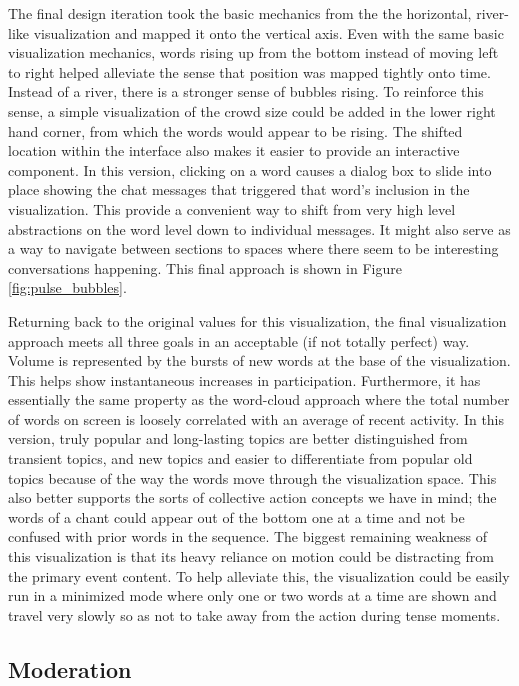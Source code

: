The final design iteration took the basic mechanics from the the horizontal, river-like visualization and mapped it onto the vertical axis. Even with the same basic visualization mechanics, words rising up from the bottom instead of moving left to right helped alleviate the sense that position was mapped tightly onto time. Instead of a river, there is a stronger sense of bubbles rising. To reinforce this sense, a simple visualization of the crowd size could be added in the lower right hand corner, from which the words would appear to be rising. The shifted location within the interface also makes it easier to provide an interactive component. In this version, clicking on a word causes a dialog box to slide into place showing the chat messages that triggered that word's inclusion in the visualization. This provide a convenient way to shift from very high level abstractions on the word level down to individual messages. It might also serve as a way to navigate between sections to spaces where there seem to be interesting conversations happening. This final approach is shown in Figure \ref{fig:pulse_bubbles}.

Returning back to the original values for this visualization, the final visualization approach meets all three goals in an acceptable (if not totally perfect) way. Volume is represented by the bursts of new words at the base of the visualization. This helps show instantaneous increases in participation. Furthermore, it has essentially the same property as the word-cloud approach where the total number of words on screen is loosely correlated with an average of recent activity. In this version, truly popular and long-lasting topics are better distinguished from transient topics, and new topics and easier to differentiate from popular old topics because of the way the words move through the visualization space. This also better supports the sorts of collective action concepts we have in mind; the words of a chant could appear out of the bottom one at a time and not be confused with prior words in the sequence. The biggest remaining weakness of this visualization is that its heavy reliance on motion could be distracting from the primary event content. To help alleviate this, the visualization could be easily run in a minimized mode where only one or two words at a time are shown and travel very slowly so as not to take away from the action during tense moments.



\subsection{Moderation}




